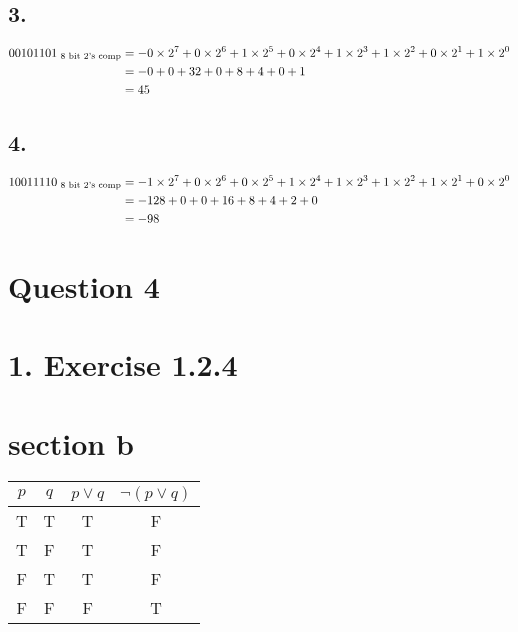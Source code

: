 \documentclass[10pt]{article}
\begin{document}
\subsection*{3.}

$$
\begin{aligned}
00101101 \textsubscript{ 8 bit 2's comp} & =
-0 \times 2^{7}
+0 \times 2^{6}
+1 \times 2^{5}
+0 \times 2^{4}
+1 \times 2^{3}
+1 \times 2^{2}
+0 \times 2^{1}
+1 \times 2^{0} \\
& =-0+0+32+0+8+4+0+1 \\
& =45
\end{aligned}
$$

\subsection*{4.}

$$
\begin{aligned}
10011110 \textsubscript{ 8 bit 2's comp} & =
-1 \times 2^{7}
+0 \times 2^{6}
+0 \times 2^{5}
+1 \times 2^{4}
+1 \times 2^{3}
+1 \times 2^{2}
+1 \times 2^{1}
+0 \times 2^{0} \\
& =-128+0+0+16+8+4+2+0 \\
& =-98
\end{aligned}
$$

\pagebreak
\section*{Question 4}
\section*{1. Exercise 1.2.4}
\section*{section b}
\begin{center}
\begin{tabular}{|c|c|c|c|}
\hline
$p$ & $q$ & $p \vee q$ & $\neg(p \vee q)$ \\
\hline
T & T & T & F \\
\hline
T & F & T & F \\
\hline
F & T & T & F \\
\hline
F & F & F & T \\
\hline
\end{tabular}
\end{center}
\end{document}
